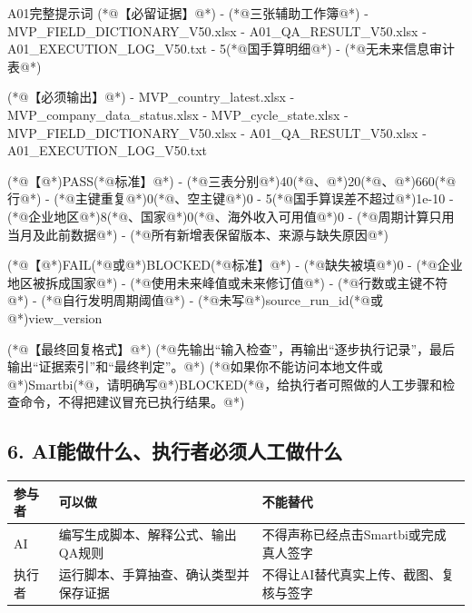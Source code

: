 \documentclass[UTF8,openany,zihao=-4]{ctexbook}
\renewcommand{\_}{\textunderscore\allowbreak}
\begin{document}
\begin{PromptBox}{A01完整提示词}
(*@{\promptcjk 【必留证据】}@*)
- (*@{\promptcjk 三张辅助工作簿}@*)
- MVP_FIELD_DICTIONARY_V50.xlsx
- A01_QA_RESULT_V50.xlsx
- A01_EXECUTION_LOG_V50.txt
- 5(*@{\promptcjk 国手算明细}@*)
- (*@{\promptcjk 无未来信息审计表}@*)

(*@{\promptcjk 【必须输出】}@*)
- MVP_country_latest.xlsx
- MVP_company_data_status.xlsx
- MVP_cycle_state.xlsx
- MVP_FIELD_DICTIONARY_V50.xlsx
- A01_QA_RESULT_V50.xlsx
- A01_EXECUTION_LOG_V50.txt

(*@{\promptcjk 【}@*)PASS(*@{\promptcjk 标准】}@*)
- (*@{\promptcjk 三表分别}@*)40(*@{\promptcjk 、}@*)20(*@{\promptcjk 、}@*)660(*@{\promptcjk 行}@*)
- (*@{\promptcjk 主键重复}@*)0(*@{\promptcjk 、空主键}@*)0
- 5(*@{\promptcjk 国手算误差不超过}@*)1e-10
- (*@{\promptcjk 企业地区}@*)8(*@{\promptcjk 、国家}@*)0(*@{\promptcjk 、海外收入可用值}@*)0
- (*@{\promptcjk 周期计算只用当月及此前数据}@*)
- (*@{\promptcjk 所有新增表保留版本、来源与缺失原因}@*)

(*@{\promptcjk 【}@*)FAIL(*@{\promptcjk 或}@*)BLOCKED(*@{\promptcjk 标准】}@*)
- (*@{\promptcjk 缺失被填}@*)0
- (*@{\promptcjk 企业地区被拆成国家}@*)
- (*@{\promptcjk 使用未来峰值或未来修订值}@*)
- (*@{\promptcjk 行数或主键不符}@*)
- (*@{\promptcjk 自行发明周期阈值}@*)
- (*@{\promptcjk 未写}@*)source_run_id(*@{\promptcjk 或}@*)view_version

(*@{\promptcjk 【最终回复格式】}@*)
(*@{\promptcjk 先输出“输入检查”，再输出“逐步执行记录”，最后输出“证据索引”和“最终判定”。}@*)
(*@{\promptcjk 如果你不能访问本地文件或}@*)Smartbi(*@{\promptcjk ，请明确写}@*)BLOCKED(*@{\promptcjk ，给执行者可照做的人工步骤和检查命令，不得把建议冒充已执行结果。}@*)
\end{PromptBox}

\subsection*{6. AI能做什么、执行者必须人工做什么}
\noindent\begin{tabularx}{\textwidth}{@{}p{}XX@{}}
\toprule
\textbf{参与者} & \textbf{可以做} & \textbf{不能替代} \\
\midrule
AI & 编写生成脚本、解释公式、输出QA规则 & 不得声称已经点击Smartbi或完成真人签字 \\
执行者 & 运行脚本、手算抽查、确认类型并保存证据 & 不得让AI替代真实上传、截图、复核与签字 \\
\bottomrule
\end{tabularx}
\end{document}

